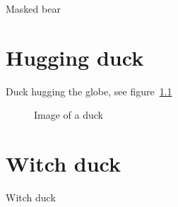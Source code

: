 Masked bear

\tagstructend %

\cleardoublepage


\chapter{Hugging duck}

Duck hugging the globe, see figure~\ref{fig:duck}

\begin{figure}
\caption{Image of a duck\label{fig:duck}}
\end{figure}


\chapter{Witch duck}

Witch duck

\tagstructend 

